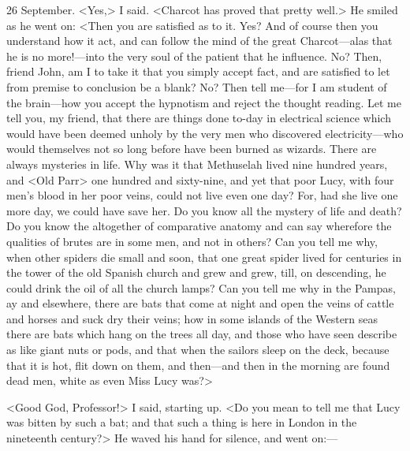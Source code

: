 \begin{diary}{26 September.}
<Yes,> I said. <Charcot has proved that pretty well.> He smiled as he went on: <Then you are satisfied as to it. Yes? And of course then you understand how it act, and can follow the mind of the great Charcot—alas that he is no more!—into the very soul of the patient that he influence. No? Then, friend John, am I to take it that you simply accept fact, and are satisfied to let from premise to conclusion be a blank? No? Then tell me—for I am student of the brain—how you accept the hypnotism and reject the thought reading. Let me tell you, my friend, that there are things done to-day in electrical science which would have been deemed unholy by the very men who discovered electricity—who would themselves not so long before have been burned as wizards. There are always mysteries in life. Why was it that Methuselah lived nine hundred years, and <Old Parr> one hundred and sixty-nine, and yet that poor Lucy, with four men's blood in her poor veins, could not live even one day? For, had she live one more day, we could have save her. Do you know all the mystery of life and death? Do you know the altogether of comparative anatomy and can say wherefore the qualities of brutes are in some men, and not in others? Can you tell me why, when other spiders die small and soon, that one great spider lived for centuries in the tower of the old Spanish church and grew and grew, till, on descending, he could drink the oil of all the church lamps? Can you tell me why in the Pampas, ay and elsewhere, there are bats that come at night and open the veins of cattle and horses and suck dry their veins; how in some islands of the Western seas there are bats which hang on the trees all day, and those who have seen describe as like giant nuts or pods, and that when the sailors sleep on the deck, because that it is hot, flit down on them, and then—and then in the morning are found dead men, white as even Miss Lucy was?>

<Good God, Professor!> I said, starting up. <Do you mean to tell me that Lucy was bitten by such a bat; and that such a thing is here in London in the nineteenth century?> He waved his hand for silence, and went on:—


\end{diary}
